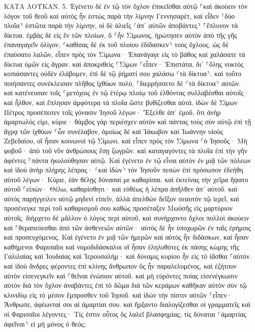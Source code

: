 \documentclass[twoside, 9pt]{extreport}
\begin{document}
ΚΑΤΑ ΛΟΥΚΑΝ.
5.
Ἐγένετο δὲ ἐν τῷ τὸν ὄχλον ἐπικεῖσθαι αὐτῷ ⸀καὶ ἀκούειν τὸν λόγον τοῦ θεοῦ καὶ αὐτὸς ἦν ἑστὼς παρὰ τὴν λίμνην Γεννησαρὲτ, 
καὶ εἶδεν ⸂δύο πλοῖα⸃ ἑστῶτα παρὰ τὴν λίμνην, οἱ δὲ ἁλιεῖς ⸂ἀπ᾽ αὐτῶν ἀποβάντες⸃ ⸀ἔπλυνον τὰ δίκτυα. 
ἐμβὰς δὲ εἰς ἓν τῶν πλοίων, ὃ ⸀ἦν Σίμωνος, ἠρώτησεν αὐτὸν ἀπὸ τῆς γῆς ἐπαναγαγεῖν ὀλίγον, ⸂καθίσας δὲ ἐκ τοῦ πλοίου ἐδίδασκεν⸃ τοὺς ὄχλους. 
ὡς δὲ ἐπαύσατο λαλῶν, εἶπεν πρὸς τὸν Σίμωνα· Ἐπανάγαγε εἰς τὸ βάθος καὶ χαλάσατε τὰ δίκτυα ὑμῶν εἰς ἄγραν. 
καὶ ἀποκριθεὶς ⸀Σίμων ⸀εἶπεν· Ἐπιστάτα, δι᾽ ⸀ὅλης νυκτὸς κοπιάσαντες οὐδὲν ἐλάβομεν, ἐπὶ δὲ τῷ ῥήματί σου χαλάσω ⸂τὰ δίκτυα⸃. 
καὶ τοῦτο ποιήσαντες συνέκλεισαν πλῆθος ἰχθύων πολύ, ⸀διερρήσσετο δὲ ⸂τὰ δίκτυα⸃ αὐτῶν. 
καὶ κατένευσαν τοῖς ⸀μετόχοις ἐν τῷ ἑτέρῳ πλοίῳ τοῦ ἐλθόντας συλλαβέσθαι αὐτοῖς· καὶ ἦλθον, καὶ ἔπλησαν ἀμφότερα τὰ πλοῖα ὥστε βυθίζεσθαι αὐτά. 
ἰδὼν δὲ Σίμων Πέτρος προσέπεσεν τοῖς γόνασιν Ἰησοῦ λέγων· Ἔξελθε ἀπ᾽ ἐμοῦ, ὅτι ἀνὴρ ἁμαρτωλός εἰμι, κύριε· 
θάμβος γὰρ περιέσχεν αὐτὸν καὶ πάντας τοὺς σὺν αὐτῷ ἐπὶ τῇ ἄγρᾳ τῶν ἰχθύων ⸀ὧν συνέλαβον, 
ὁμοίως δὲ καὶ Ἰάκωβον καὶ Ἰωάννην υἱοὺς Ζεβεδαίου, οἳ ἦσαν κοινωνοὶ τῷ Σίμωνι. καὶ εἶπεν πρὸς τὸν Σίμωνα ⸀ὁ Ἰησοῦς· Μὴ φοβοῦ· ἀπὸ τοῦ νῦν ἀνθρώπους ἔσῃ ζωγρῶν. 
καὶ καταγαγόντες τὰ πλοῖα ἐπὶ τὴν γῆν ἀφέντες ⸀πάντα ἠκολούθησαν αὐτῷ. 
Καὶ ἐγένετο ἐν τῷ εἶναι αὐτὸν ἐν μιᾷ τῶν πόλεων καὶ ἰδοὺ ἀνὴρ πλήρης λέπρας· ⸂καὶ ἰδὼν⸃ τὸν Ἰησοῦν πεσὼν ἐπὶ πρόσωπον ἐδεήθη αὐτοῦ λέγων· Κύριε, ἐὰν θέλῃς δύνασαί με καθαρίσαι. 
καὶ ἐκτείνας τὴν χεῖρα ἥψατο αὐτοῦ ⸀εἰπών· Θέλω, καθαρίσθητι· καὶ εὐθέως ἡ λέπρα ἀπῆλθεν ἀπ᾽ αὐτοῦ. 
καὶ αὐτὸς παρήγγειλεν αὐτῷ μηδενὶ εἰπεῖν, ἀλλὰ ἀπελθὼν δεῖξον σεαυτὸν τῷ ἱερεῖ, καὶ προσένεγκε περὶ τοῦ καθαρισμοῦ σου καθὼς προσέταξεν Μωϋσῆς εἰς μαρτύριον αὐτοῖς. 
διήρχετο δὲ μᾶλλον ὁ λόγος περὶ αὐτοῦ, καὶ συνήρχοντο ὄχλοι πολλοὶ ἀκούειν καὶ ⸀θεραπεύεσθαι ἀπὸ τῶν ἀσθενειῶν αὐτῶν· 
αὐτὸς δὲ ἦν ὑποχωρῶν ἐν ταῖς ἐρήμοις καὶ προσευχόμενος. 
Καὶ ἐγένετο ἐν μιᾷ τῶν ἡμερῶν καὶ αὐτὸς ἦν διδάσκων, καὶ ἦσαν καθήμενοι Φαρισαῖοι καὶ νομοδιδάσκαλοι οἳ ἦσαν ἐληλυθότες ἐκ πάσης κώμης τῆς Γαλιλαίας καὶ Ἰουδαίας καὶ Ἰερουσαλήμ· καὶ δύναμις κυρίου ἦν εἰς τὸ ἰᾶσθαι ⸀αὐτόν. 
καὶ ἰδοὺ ἄνδρες φέροντες ἐπὶ κλίνης ἄνθρωπον ὃς ἦν παραλελυμένος, καὶ ἐζήτουν αὐτὸν εἰσενεγκεῖν καὶ ⸀θεῖναι ἐνώπιον αὐτοῦ. 
καὶ μὴ εὑρόντες ποίας εἰσενέγκωσιν αὐτὸν διὰ τὸν ὄχλον ἀναβάντες ἐπὶ τὸ δῶμα διὰ τῶν κεράμων καθῆκαν αὐτὸν σὺν τῷ κλινιδίῳ εἰς τὸ μέσον ἔμπροσθεν τοῦ Ἰησοῦ. 
καὶ ἰδὼν τὴν πίστιν αὐτῶν ⸀εἶπεν· Ἄνθρωπε, ἀφέωνταί σοι αἱ ἁμαρτίαι σου. 
καὶ ἤρξαντο διαλογίζεσθαι οἱ γραμματεῖς καὶ οἱ Φαρισαῖοι λέγοντες· Τίς ἐστιν οὗτος ὃς λαλεῖ βλασφημίας; τίς δύναται ⸂ἁμαρτίας ἀφεῖναι⸃ εἰ μὴ μόνος ὁ θεός; 
\end{document}
